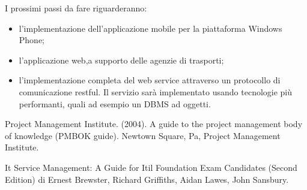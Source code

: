 \documentclass[conference]{IEEEtran}
\begin{document}
I prossimi passi da fare riguarderanno:
\begin{itemize}
\item l\rq implementazione dell\rq applicazione mobile per la piattaforma Windows Phone;
\item l\rq applicazione web,a supporto delle agenzie di trasporti;
\item l\rq implementazione completa del web service attraverso un protocollo di comunicazione restful. Il servizio sar\`{a} implementato usando tecnologie pi\`{u} performanti, quali ad esempio un DBMS ad oggetti.
\end{itemize}
\begin{thebibliography}{1}

Project Management Institute. (2004). A guide to the project management body of knowledge (PMBOK guide). Newtown Square, Pa, Project Management Institute.

It Service Management: A Guide for Itil Foundation Exam Candidates (Second Edition) di Ernest Brewster, Richard Griffiths, Aidan Lawes, John Sansbury.


\end{thebibliography}




\end{document}
